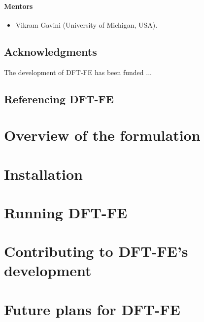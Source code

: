 \documentclass{article}
\newcommand{\dftfe}{\textsc{DFT-FE}}
\begin{document}
\paragraph{Mentors}
\begin{itemize}
	\item Vikram Gavini (University of Michigan, USA).
\end{itemize}

\subsection{Acknowledgments}
The development of \dftfe{} has been funded ...



\subsection{Referencing \dftfe{}}

\section{Overview of the formulation}

\section{Installation}

\section{Running \dftfe}

\section{Contributing to \dftfe{}'s development}



\section{Future plans for \dftfe}
\label{sec:future}
\end{document}
